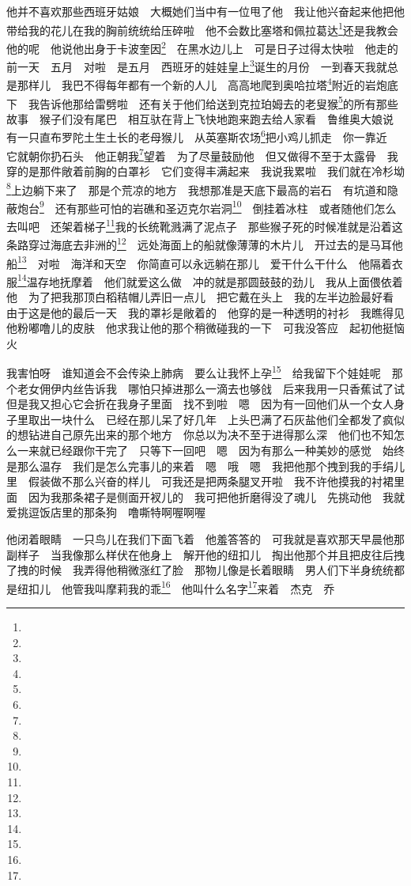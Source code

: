 \par 他并不喜欢那些西班牙姑娘　大概她们当中有一位甩了他　我让他兴奋起来他把他带给我的花儿在我的胸前统统给压碎啦　他不会数比塞塔和佩拉葛达\footnote{}还是我教会他的呢　他说他出身于卡波奎因\footnote{}　在黑水边儿上　可是日子过得太快啦　他走的前一天　五月　对啦　是五月　西班牙的娃娃皇上\footnote{}诞生的月份　一到春天我就总是那样儿　我巴不得每年都有一个新的人儿　高高地爬到奥哈拉塔\footnote{}附近的岩炮底下　我告诉他那给雷劈啦　还有关于他们给送到克拉珀姆去的老叟猴\footnote{}的所有那些故事　猴子们没有尾巴　相互驮在背上飞快地跑来跑去给人家看　鲁维奥大娘说　有一只直布罗陀土生土长的老母猴儿　从英塞斯农场\footnote{}把小鸡儿抓走　你一靠近　它就朝你扔石头　他正朝我\footnote{}望着　为了尽量鼓励他　但又做得不至于太露骨　我穿的是那件敞着前胸的白罩衫　它们变得丰满起来　我说我累啦　我们就在冷杉坳\footnote{}上边躺下来了　那是个荒凉的地方　我想那准是天底下最高的岩石　有坑道和隐蔽炮台\footnote{}　还有那些可怕的岩礁和圣迈克尔岩洞\footnote{}　倒挂着冰柱　或者随他们怎么去叫吧　还架着梯子\footnote{}我的长统靴溅满了泥点子　那些猴子死的时候准就是沿着这条路穿过海底去非洲的\footnote{}　远处海面上的船就像薄薄的木片儿　开过去的是马耳他船\footnote{}　对啦　海洋和天空　你简直可以永远躺在那儿　爱干什么干什么　他隔着衣服\footnote{}温存地抚摩着　他们就爱这么做　冲的就是那圆鼓鼓的劲儿　我从上面偎依着他　为了把我那顶白稻秸帽儿弄旧一点儿　把它戴在头上　我的左半边脸最好看　由于这是他的最后一天　我的罩衫是敞着的　他穿的是一种透明的衬衫　我瞧得见他粉嘟噜儿的皮肤　他求我让他的那个稍微碰我的一下　可我没答应　起初他挺恼火　
\par 我害怕呀　谁知道会不会传染上肺病　要么让我怀上孕\footnote{}　给我留下个娃娃呢　那个老女佣伊内丝告诉我　哪怕只掉进那么一滴去也够戗　后来我用一只香蕉试了试　但是我又担心它会折在我身子里面　找不到啦　嗯　因为有一回他们从一个女人身子里取出一块什么　已经在那儿呆了好几年　上头巴满了石灰盐他们全都发了疯似的想钻进自己原先出来的那个地方　你总以为决不至于进得那么深　他们也不知怎么一来就已经跟你干完了　只等下一回吧　嗯　因为有那么一种美妙的感觉　始终是那么温存　我们是怎么完事儿的来着　嗯　哦　嗯　我把他那个拽到我的手绢儿里　假装做不那么兴奋的样儿　可我还是把两条腿叉开啦　我不许他摸我的衬裙里面　因为我那条裙子是侧面开衩儿的　我可把他折磨得没了魂儿　先挑动他　我就爱挑逗饭店里的那条狗　噜嘶特啊喔啊喔　
\par 他闭着眼睛　一只鸟儿在我们下面飞着　他羞答答的　可我就是喜欢那天早晨他那副样子　当我像那么样伏在他身上　解开他的纽扣儿　掏出他那个并且把皮往后拽了拽的时候　我弄得他稍微涨红了脸　那物儿像是长着眼睛　男人们下半身统统都是纽扣儿　他管我叫摩莉我的乖\footnote{}　他叫什么名字\footnote{}来着　杰克　乔　
